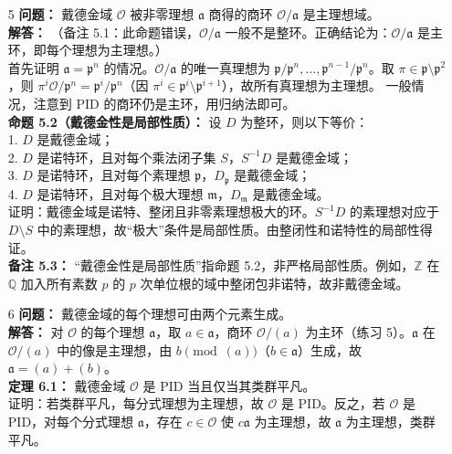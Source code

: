 \documentclass[UTF8]{ctexart}
\begin{document}
\begin{enumerate}
\begin{enumerate}
\item[5]
\textbf{问题：} 戴德金域 \(\mathcal{O}\) 被非零理想 \(\mathfrak{a}\) 商得的商环 \(\mathcal{O} / \mathfrak{a}\) 是主理想域。\\
\textbf{解答：} （备注 5.1：此命题错误，\(\mathcal{O} / \mathfrak{a}\) 一般不是整环。正确结论为：\(\mathcal{O} / \mathfrak{a}\) 是主环，即每个理想为主理想。）\\
首先证明 \(\mathfrak{a} = \mathfrak{p}^n\) 的情况。\(\mathcal{O} / \mathfrak{a}\) 的唯一真理想为 \(\mathfrak{p} / \mathfrak{p}^n, \dots, \mathfrak{p}^{n-1} / \mathfrak{p}^n\)。取 \(\pi \in \mathfrak{p} \setminus \mathfrak{p}^2\)，则 \(\pi^i \mathcal{O} / \mathfrak{p}^n = \mathfrak{p}^i / \mathfrak{p}^n\)（因 \(\pi^i \in \mathfrak{p}^i \setminus \mathfrak{p}^{i+1}\)），故所有真理想为主理想。  
一般情况，注意到 PID 的商环仍是主环，用归纳法即可。\\
\textbf{命题 5.2（戴德金性是局部性质）：} 设 \(D\) 为整环，则以下等价：\\
1. \(D\) 是戴德金域；\\
2. \(D\) 是诺特环，且对每个乘法闭子集 \(S\)，\(S^{-1} D\) 是戴德金域；\\
3. \(D\) 是诺特环，且对每个素理想 \(\mathfrak{p}\)，\(D_\mathfrak{p}\) 是戴德金域；\\
4. \(D\) 是诺特环，且对每个极大理想 \(\mathfrak{m}\)，\(D_\mathfrak{m}\) 是戴德金域。\\
证明：戴德金域是诺特、整闭且非零素理想极大的环。\(S^{-1} D\) 的素理想对应于 \(D \setminus S\) 中的素理想，故“极大”条件是局部性质。由整闭性和诺特性的局部性得证。\\
\textbf{备注 5.3：} “戴德金性是局部性质”指命题 5.2，非严格局部性质。例如，\(\mathbb{Z}\) 在 \(\mathbb{Q}\) 加入所有素数 \(p\) 的 \(p\) 次单位根的域中整闭包非诺特，故非戴德金域。

\item[6]
\textbf{问题：} 戴德金域的每个理想可由两个元素生成。\\
\textbf{解答：} 对 \(\mathcal{O}\) 的每个理想 \(\mathfrak{a}\)，取 \(a \in \mathfrak{a}\)，商环 \(\mathcal{O} / (a)\) 为主环（练习 5）。\(\mathfrak{a}\) 在 \(\mathcal{O} / (a)\) 中的像是主理想，由 \(b \pmod{(a)}\)（\(b \in \mathfrak{a}\)）生成，故 \(\mathfrak{a} = (a) + (b)\)。\\
\textbf{定理 6.1：} 戴德金域 \(\mathcal{O}\) 是 PID 当且仅当其类群平凡。\\
证明：若类群平凡，每分式理想为主理想，故 \(\mathcal{O}\) 是 PID。反之，若 \(\mathcal{O}\) 是 PID，对每个分式理想 \(\mathfrak{a}\)，存在 \(c \in \mathcal{O}\) 使 \(c \mathfrak{a}\) 为主理想，故 \(\mathfrak{a}\) 为主理想，类群平凡。


\end{enumerate}
\end{enumerate}
\end{document}
